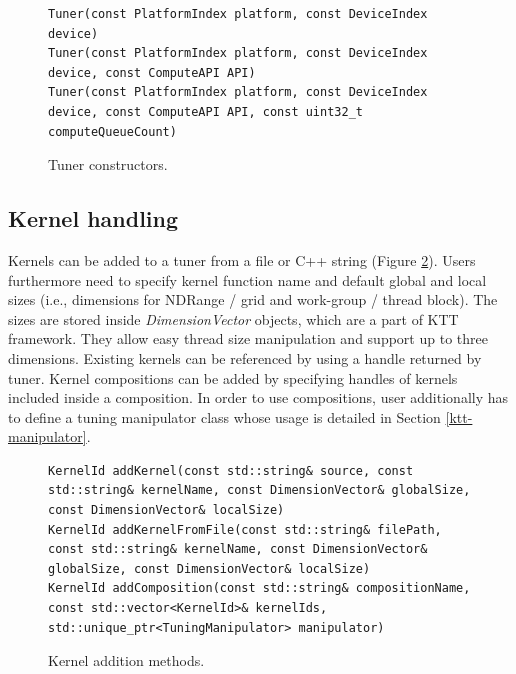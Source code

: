 \documentclass
[
    digital, %
    oneside, %
    table, %
    nolof, %
    nolot, %
    nocover %
]{fithesis3}
\begin{document}
\begin{figure}
\begin{adjustwidth}{-1cm}{-1cm}
\begin{lstlisting}
Tuner(const PlatformIndex platform, const DeviceIndex device)
Tuner(const PlatformIndex platform, const DeviceIndex device, const ComputeAPI API)
Tuner(const PlatformIndex platform, const DeviceIndex device, const ComputeAPI API, const uint32_t computeQueueCount)
\end{lstlisting}
\caption{Tuner constructors.}
\label{ktt-constructors}
\end{adjustwidth}
\end{figure}

\subsection{Kernel handling}
Kernels can be added to a tuner from a file or C++ string (Figure \ref{ktt-kernel-methods}). Users furthermore need to specify kernel function name and
default global and local sizes (i.e., dimensions for NDRange / grid and work-group / thread block). The sizes are stored inside \textit{DimensionVector}
objects, which are a part of KTT framework. They allow easy thread size manipulation and support up to three dimensions. Existing kernels can be referenced
by using a handle returned by tuner. Kernel compositions can be added by specifying handles of kernels included inside a composition. In order to use
compositions, user additionally has to define a tuning manipulator class whose usage is detailed in Section \ref{ktt-manipulator}.

\begin{figure}
\begin{adjustwidth}{-1cm}{-1cm}
\begin{lstlisting}
KernelId addKernel(const std::string& source, const std::string& kernelName, const DimensionVector& globalSize, const DimensionVector& localSize)
KernelId addKernelFromFile(const std::string& filePath, const std::string& kernelName, const DimensionVector& globalSize, const DimensionVector& localSize)
KernelId addComposition(const std::string& compositionName, const std::vector<KernelId>& kernelIds, std::unique_ptr<TuningManipulator> manipulator)
\end{lstlisting}
\caption{Kernel addition methods.}
\label{ktt-kernel-methods}
\end{adjustwidth}
\end{figure}
\end{document}

